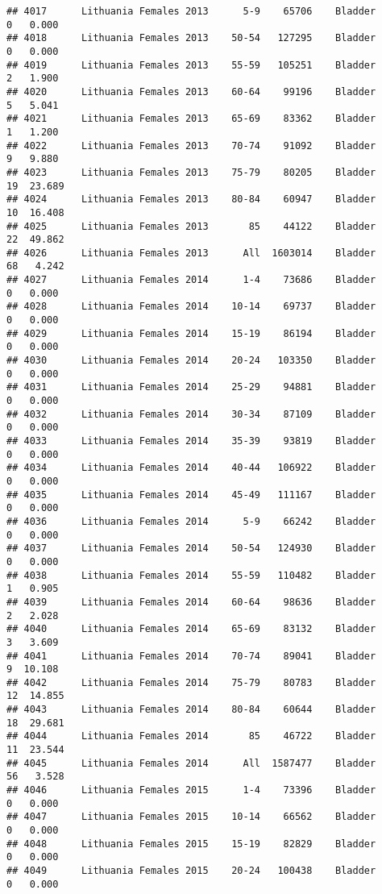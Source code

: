 \documentclass[
]{article}
\begin{document}
\begin{verbatim}
## 4017      Lithuania Females 2013      5-9    65706    Bladder      0   0.000
## 4018      Lithuania Females 2013    50-54   127295    Bladder      0   0.000
## 4019      Lithuania Females 2013    55-59   105251    Bladder      2   1.900
## 4020      Lithuania Females 2013    60-64    99196    Bladder      5   5.041
## 4021      Lithuania Females 2013    65-69    83362    Bladder      1   1.200
## 4022      Lithuania Females 2013    70-74    91092    Bladder      9   9.880
## 4023      Lithuania Females 2013    75-79    80205    Bladder     19  23.689
## 4024      Lithuania Females 2013    80-84    60947    Bladder     10  16.408
## 4025      Lithuania Females 2013       85    44122    Bladder     22  49.862
## 4026      Lithuania Females 2013      All  1603014    Bladder     68   4.242
## 4027      Lithuania Females 2014      1-4    73686    Bladder      0   0.000
## 4028      Lithuania Females 2014    10-14    69737    Bladder      0   0.000
## 4029      Lithuania Females 2014    15-19    86194    Bladder      0   0.000
## 4030      Lithuania Females 2014    20-24   103350    Bladder      0   0.000
## 4031      Lithuania Females 2014    25-29    94881    Bladder      0   0.000
## 4032      Lithuania Females 2014    30-34    87109    Bladder      0   0.000
## 4033      Lithuania Females 2014    35-39    93819    Bladder      0   0.000
## 4034      Lithuania Females 2014    40-44   106922    Bladder      0   0.000
## 4035      Lithuania Females 2014    45-49   111167    Bladder      0   0.000
## 4036      Lithuania Females 2014      5-9    66242    Bladder      0   0.000
## 4037      Lithuania Females 2014    50-54   124930    Bladder      0   0.000
## 4038      Lithuania Females 2014    55-59   110482    Bladder      1   0.905
## 4039      Lithuania Females 2014    60-64    98636    Bladder      2   2.028
## 4040      Lithuania Females 2014    65-69    83132    Bladder      3   3.609
## 4041      Lithuania Females 2014    70-74    89041    Bladder      9  10.108
## 4042      Lithuania Females 2014    75-79    80783    Bladder     12  14.855
## 4043      Lithuania Females 2014    80-84    60644    Bladder     18  29.681
## 4044      Lithuania Females 2014       85    46722    Bladder     11  23.544
## 4045      Lithuania Females 2014      All  1587477    Bladder     56   3.528
## 4046      Lithuania Females 2015      1-4    73396    Bladder      0   0.000
## 4047      Lithuania Females 2015    10-14    66562    Bladder      0   0.000
## 4048      Lithuania Females 2015    15-19    82829    Bladder      0   0.000
## 4049      Lithuania Females 2015    20-24   100438    Bladder      0   0.000

\end{verbatim}
\end{document}
